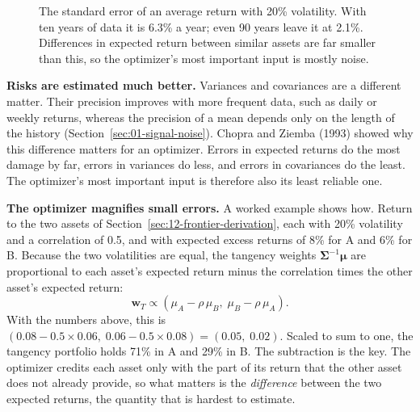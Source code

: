 \begin{figure}[htbp]
\centering
{}
\caption{The standard error of an average return with 20\% volatility. With ten years of data it is 6.3\% a year; even 90 years leave it at 2.1\%. Differences in expected return between similar assets are far smaller than this, so the optimizer's most important input is mostly noise.}
\label{fig:12-se}
\end{figure}

\textbf{Risks are estimated much better.} Variances and covariances are a different matter. Their precision improves with more frequent data, such as daily or weekly returns, whereas the precision of a mean depends only on the length of the history (Section~\ref{sec:01-signal-noise}). Chopra and Ziemba (1993) showed why this difference matters for an optimizer. Errors in expected returns do the most damage by far, errors in variances do less, and errors in covariances do the least. The optimizer's most important input is therefore also its least reliable one.

\textbf{The optimizer magnifies small errors.} A worked example shows how. Return to the two assets of Section~\ref{sec:12-frontier-derivation}, each with 20\% volatility and a correlation of 0.5, and with expected excess returns of 8\% for A and 6\% for B. Because the two volatilities are equal, the tangency weights $\boldsymbol{\Sigma}^{-1}\boldsymbol{\mu}$ are proportional to each asset's expected return minus the correlation times the other asset's expected return:
\begin{equation}
  \mathbf{w}_T \propto (\mu_A - \rho\,\mu_B,\; \mu_B - \rho\,\mu_A).
  \label{eq:12-two-weights}
\end{equation}
With the numbers above, this is $(0.08 - 0.5 \times 0.06,\; 0.06 - 0.5 \times 0.08) = (0.05,\; 0.02)$. Scaled to sum to one, the tangency portfolio holds 71\% in A and 29\% in B. The subtraction is the key. The optimizer credits each asset only with the part of its return that the other asset does not already provide, so what matters is the \emph{difference} between the two expected returns, the quantity that is hardest to estimate.

